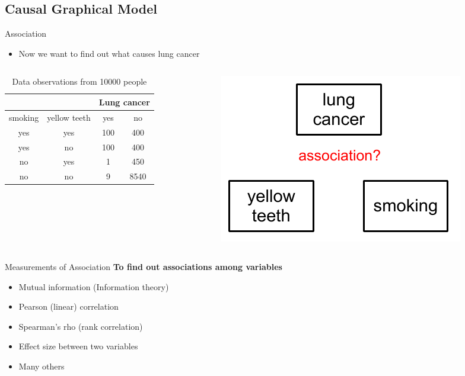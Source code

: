 \subsection{Causal Graphical Model}
\begin{frame}{Association}
\begin{itemize}
\item Now we want to find out what \alert{causes} lung cancer
\end{itemize} \pause
\begin{columns}
\begin{column}{0.5\textwidth}
\begin{table}
\centering
\begin{tabular}{|c|c|c|c|}
\hline
& & \multicolumn{2}{|c|}{Lung cancer}\\\hline
smoking & yellow teeth & yes & no\\\hline
yes & yes & 100 & 400\\\hline
yes & no & 100 & 400\\\hline
no & yes & 1 & 450\\\hline
no & no & 9 & 8540\\\hline
\end{tabular}
\caption{Data observations from 10000 people}
\end{table}
\end{column}\hfill
\begin{column}{0.5\textwidth}
\vspace*{-0.5in}
\begin{figure}
\centering
\includegraphics[scale=0.6]{imgs/smokepl}
\end{figure}
\end{column}
\end{columns}
\end{frame}
\begin{frame}{Measurements of Association}
\textbf{To find out associations among variables}
\begin{itemize}
\item Mutual information (Information theory)
\item Pearson (linear) correlation
\item Spearman's rho (rank correlation)
\item Effect size between two variables
\item Many others
\end{itemize}
\end{frame}
